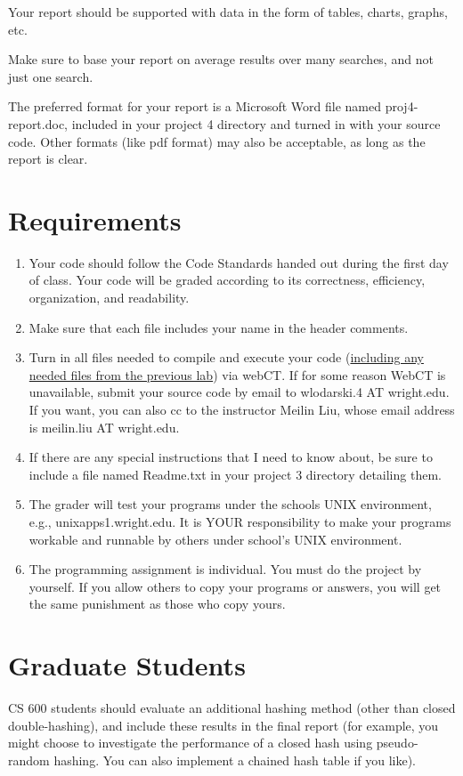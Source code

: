 \documentclass{article}
\begin{document}
Your report should be supported with data in the form of tables,
charts, graphs, etc. 

Make sure to base your report on average results over many searches,
and not just one search. 

The preferred format for your report is a Microsoft Word file named
proj4-report.doc, included in your project 4 directory and turned in
with your source code.  Other formats (like pdf format) may also be
acceptable, as long as the report is clear. 

\section*{Requirements}
\begin{enumerate}
\item Your code should follow the Code Standards handed out during the
  first day of class.  Your code will be graded according to its
  correctness, efficiency, organization, and readability. 
\item Make sure that each file includes your name in the header
  comments.
\item Turn in all files needed to compile and execute your code
  (\underline{including any needed files from the previous lab}) via
  webCT. If for some reason WebCT is unavailable, submit your source
  code by email to wlodarski.4 AT wright.edu. If you want, you can
  also cc to the instructor Meilin Liu, whose email address is
  meilin.liu AT wright.edu.  
\item If there are any special instructions that I need to know about,
  be sure to include a file named Readme.txt in your project 3
  directory detailing them. 
\item The grader will test your programs under the schools UNIX
  environment, e.g., unixapps1.wright.edu. It is YOUR responsibility
  to make your programs workable and runnable by others under school’s
  UNIX environment. 
\item The programming assignment is individual. You must do the
  project by yourself. If you allow others to copy your programs or
  answers, you will get the same punishment as those who copy yours. 
\end{enumerate}

\section*{Graduate Students}
CS 600 students should evaluate an additional hashing method (other
than closed double-hashing), and include these results in the final
report (for example, you might choose to investigate the performance
of a closed hash using pseudo-random hashing. You can also implement a
chained hash table if you like). 
\end{document}
